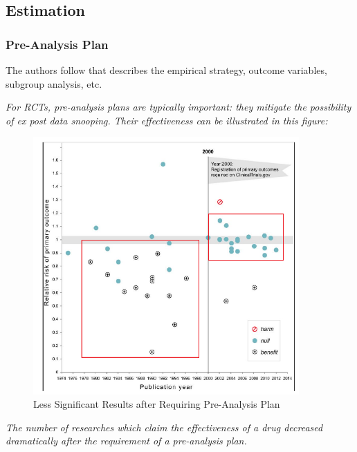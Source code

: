     \subsection{Estimation}
    
        \subsubsection{Pre-Analysis Plan}
            The authors follow  that describes the empirical strategy, outcome variables, subgroup analysis, etc.\par
            \textit{For RCTs, pre-analysis plans are typically important: they mitigate the possibility of ex post data snooping. Their effectiveness can be illustrated in this figure:}
            \begin{figure}[H]
                \centering
                \includegraphics[width=4in]{images/ch6/pre-analsis plan and data snooping.png}
                \caption{Less Significant Results after Requiring Pre-Analysis Plan}
            \end{figure}
            \textit{The number of researches which claim the effectiveness of a drug decreased dramatically after the requirement of a pre-analysis plan.}
            
